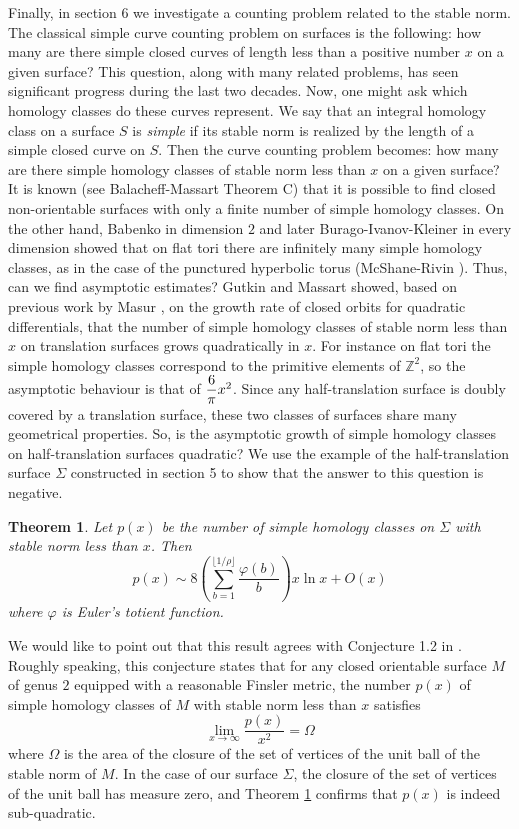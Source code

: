 \documentclass{article}
\newcommand{\ZZ}{\mathbb{Z}}
\newtheorem{thm}{Theorem}[section]
\theoremstyle{definition}
\begin{document}
Finally, in section 6 we investigate a counting problem related to the stable norm. The classical simple curve counting problem on surfaces is the following: how many are there simple closed curves of length less than a positive number $x$ on a given surface? This question, along with many related problems, has seen significant progress during the last two decades. Now, one might ask which homology classes do these curves represent. We say that an integral homology class on a surface $S$ is \emph{simple} if its stable norm is realized by the length of a simple closed curve on $S$. Then the curve counting problem becomes: how many are there simple homology classes of stable norm less than $x$ on a given surface? It is known (see Balacheff-Massart \cite{Bal-Mas} Theorem C) that it is possible to find closed non-orientable surfaces with only a finite number of simple homology classes. On the other hand, Babenko \cite{babenko} in dimension $2$ and later Burago-Ivanov-Kleiner \cite{Bur-Iva} in every dimension showed that on flat tori there are infinitely many simple homology classes, as in the case of the punctured hyperbolic torus (McShane-Rivin \cite{McShane Rivin}). Thus, can we find asymptotic estimates? Gutkin and Massart \cite{Gut-Mas} showed, based on previous work by Masur \cite{Masur88}, \cite{Masur90} on the growth rate of closed orbits for quadratic differentials, that the number of simple homology classes of stable norm less than $x$ on translation surfaces grows quadratically in $x$. For instance on flat tori the simple homology classes correspond to the primitive elements of $\ZZ^2$, so the asymptotic behaviour is that of  $\mathlarger{\frac{6}{\pi}} x^2$. Since any half-translation surface is doubly covered by a translation surface, these two classes of surfaces share many geometrical properties. So, is the asymptotic growth of simple homology classes on half-translation surfaces quadratic? We use the example of the half-translation surface $\Sigma$ constructed in section 5 to show that the answer to this question is negative. 

\begin{thm}\label{comptage}
Let $p(x)$ be the number of simple homology classes on $\Sigma$ with stable norm less than $x$.
Then $$p(x) \sim 8 \left(\sum_{b=1}^{\lfloor 1/\rho \rfloor} \frac{\varphi(b)}{b}\right )  x \ln x + O(x)$$
where $\varphi$ is Euler's totient function.
\end{thm}

We would like to point out that this result agrees with Conjecture 1.2 in \cite{Mas-Par}. Roughly speaking, this conjecture states that for any closed orientable surface $M$ of genus $2$ equipped with a reasonable Finsler metric, the number $p(x)$ of simple homology classes of $M$ with stable norm less than $x$ satisfies
$$ \lim_{x\rightarrow \infty } \frac{p(x)}{x^2} = \Omega$$
where $\Omega$ is the area of the closure of the set of vertices of the unit ball of the stable norm of $M$. In the case of our surface $\Sigma$, the closure of the set of vertices of the unit ball has measure zero, and Theorem \ref{comptage} confirms that $p(x)$ is indeed sub-quadratic. \\ 
\end{document}
